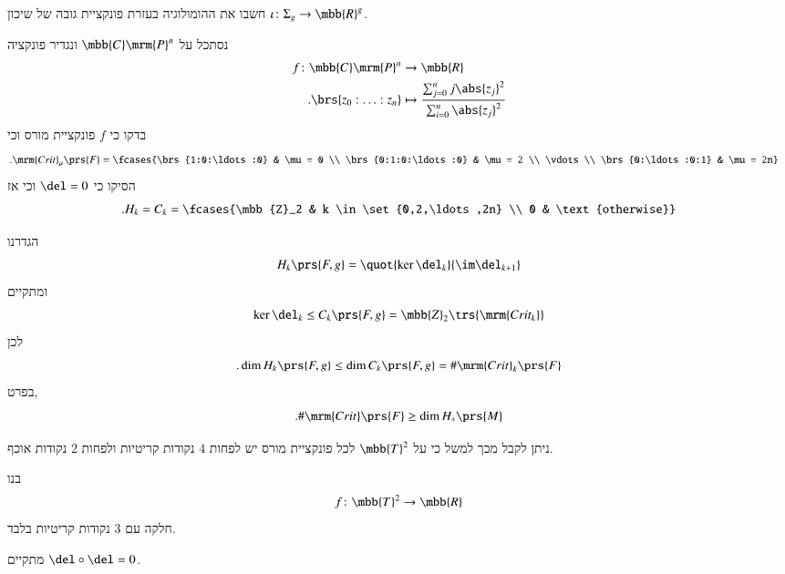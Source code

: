 \documentclass[a4paper,10pt,twoside,openany]{book}
\begin{document}
\begin{exercise}
חשבו את ההומולוגיה בעזרת פונקציית גובה של שיכון
$\iota \colon \Sigma_g \to \mbb{R}^g$.
\end{exercise}

\begin{exercise}
נסתכל על
$\mbb{C}\mrm{P}^n$
ונגדיר פונקציה
\begin{align*}
f \colon \mbb{C}\mrm{P}^n &\to \mbb{R} \\
\text{.} \brs{z_0 : \ldots : z_n} &\mapsto \frac{\sum_{j = 0}^n j \abs{z_j}^2}{\sum_{i=0}^n \abs{z_j}^2}
\end{align*}
בדקו כי
$f$
פונקציית מורס וכי
\begin{align*}
\text{.} \mrm{Crit}_\mu\prs{F} &= \fcases{\brs{1:0:\ldots:0} & \mu = 0 \\
\brs{0:1:0:\ldots:0} & \mu = 2 \\
\vdots \\
\brs{0:\ldots:0:1} & \mu = 2n}
\end{align*}
הסיקו כי
$\del = 0$
וכי אז
\begin{align*}
\text{.} H_k = C_k = \fcases{\mbb{Z}_2 & k \in \set{0,2,\ldots,2n} \\ 0 & \text{otherwise}}
\end{align*}
\end{exercise}

\begin{exercise}
הגדרנו
\[H_k\prs{F,g} = \quot{\ker \del_k}{\im \del_{k+1}}\]
ומתקיים
\[\ker \del_k \leq C_k\prs{F,g} = \mbb{Z}_2\trs{\mrm{Crit_k}}\]
לכן
\[\text{.} \dim H_k\prs{F,g} \leq \dim C_k\prs{F,g} = \# \mrm{Crit}_k\prs{F}\]
בפרט,
\[\text{.} \# \mrm{Crit}\prs{F} \geq \dim H_*\prs{M}\]

ניתן לקבל מכך למשל כי
על
$\mbb{T}^2$
לכל פונקציית מורס יש לפחות
$4$
נקודות קריטיות ולפחות
$2$
נקודות אוכף.
\end{exercise}

\begin{exercise}
בנו
\[f \colon \mbb{T}^2 \to \mbb{R}\]
חלקה עם
$3$
נקודות קריטיות בלבד.
\end{exercise}

\begin{proposition}
מתקיים
$\del \circ \del = 0$.
\end{proposition}
\end{document}
